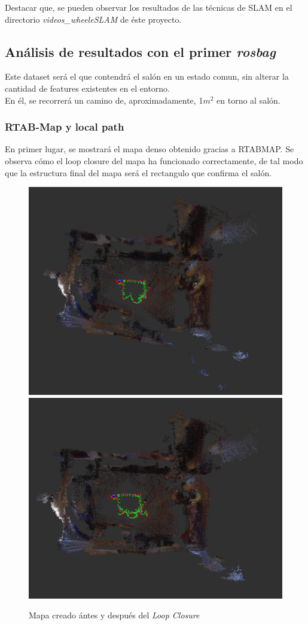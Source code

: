 Destacar que, se pueden observar los resultados de las técnicas de SLAM en el directorio \textit{videos\_wheeleSLAM} de éste proyecto.
\newpage

\subsection{Análisis de resultados con el primer \textit{rosbag}}
Este dataset será el que contendrá el salón en un estado comun, sin alterar la cantidad de features existentes en el entorno. \\
En él, se recorrerá un camino de, aproximadamente, 1$m^2$ en torno al salón.

\subsubsection{RTAB-Map y local path}
En primer lugar, se mostrará el mapa denso obtenido gracias a RTABMAP. Se observa cómo el loop closure del mapa ha funcionado correctamente, de tal modo que la estructura final
del mapa será el rectangulo que confirma el salón.
\begin{figure}[h!]
    \centering
    \includegraphics[width=.4\textwidth]{images/slam/bag1_rtabmap_noLC}
    \includegraphics[width=.415\textwidth]{images/slam/bag1_rtabmap_LC}
    \caption{Mapa creado ántes y después del \textit{Loop Closure}}
\end{figure}


